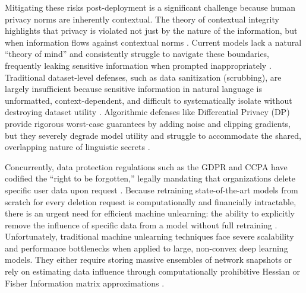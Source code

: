 \documentclass[11pt]{article}
\begin{document}
Mitigating these risks post-deployment is a significant challenge because human privacy norms are inherently contextual. The theory of contextual integrity highlights that privacy is violated not just by the nature of the information, but when information flows against contextual norms \citep{brown2022does, mireshghallah2023can}. Current models lack a natural ``theory of mind'' and consistently struggle to navigate these boundaries, frequently leaking sensitive information when prompted inappropriately \citep{mireshghallah2023can}. Traditional dataset-level defenses, such as data sanitization (scrubbing), are largely insufficient because sensitive information in natural language is unformatted, context-dependent, and difficult to systematically isolate without destroying dataset utility \citep{brown2022does}. Algorithmic defenses like Differential Privacy (DP) provide rigorous worst-case guarantees by adding noise and clipping gradients, but they severely degrade model utility and struggle to accommodate the shared, overlapping nature of linguistic secrets \citep{abadi2016deep, bagdasaryan2019differential}.

Concurrently, data protection regulations such as the GDPR and CCPA have codified the ``right to be forgotten,'' legally mandating that organizations delete specific user data upon request \citep{tarun2023fast}. Because retraining state-of-the-art models from scratch for every deletion request is computationally and financially intractable, there is an urgent need for efficient machine unlearning: the ability to explicitly remove the influence of specific data from a model without full retraining \citep{bourtoule2021machine}. Unfortunately, traditional machine unlearning techniques face severe scalability and performance bottlenecks when applied to large, non-convex deep learning models. They either require storing massive ensembles of network snapshots \citep{bourtoule2021machine} or rely on estimating data influence through computationally prohibitive Hessian or Fisher Information matrix approximations \citep{golatkar2020eternal}.
\end{document}
